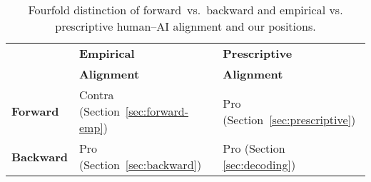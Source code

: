 \documentclass{article}
\theoremstyle{plain}
\theoremstyle{definition}
\theoremstyle{remark}
\begin{document}
\begin{table}[t]
\centering
\caption{Fourfold distinction of forward~vs.~backward and empirical vs. prescriptive human--AI alignment and our positions. \\}
\label{tab:fourfold}
\begin{tabular}{l|l|l}
\toprule
\toprule
                     & \textbf{Empirical}                          & \textbf{Prescriptive}          \\
                     & \textbf{Alignment} & \textbf{Alignment} \\
\midrule
\textbf{Forward}     & Contra (Section~\ref{sec:forward-emp})                                           & Pro (Section~\ref{sec:prescriptive})          \\
\midrule
\textbf{Backward}    & Pro (Section~\ref{sec:backward})   & Pro (Section \ref{sec:decoding})   \\
\bottomrule
\end{tabular}
\end{table}
%



  










\end{document}
